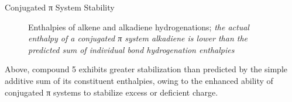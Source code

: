 \begin{core}{Conjugated π System Stability}
\begin{figure}[H]
        \vspace{2.5em}

        \begin{minipage}{\textwidth}
          \centering
        \end{minipage}

        \vspace{2.5em}

        \begin{minipage}{\textwidth}
          \centering
        \end{minipage}

        \caption{Enthalpies of alkene and alkadiene hydrogenations; \textit{the actual enthalpy of a conjugated π system alkadiene is lower than the predicted sum of individual bond hydrogenation enthalpies}}
        \label{fig:ph21a}
      \end{figure}

      Above, compound 5 exhibits greater stabilization than predicted by the simple additive sum of its constituent enthalpies, owing to the enhanced ability of conjugated π systems to stabilize excess or deficient charge.


\end{core}
